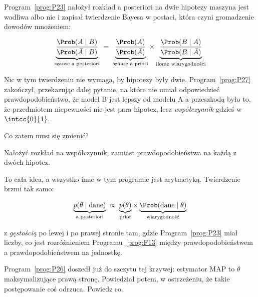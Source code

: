 \begin{fr}
Program~\ref{prog:P23} nałożył rozkład a posteriori na dwie hipotezy
\dash{} maszyna jest wadliwa albo nie \dash{} i zapisał twierdzenie Bayesa w
postaci, która czyni gromadzenie dowodów mnożeniem:

\[ \underbrace{\frac{\Prob(A \mid B)}{\Prob(\bar{A} \mid B)}}_{\text{szanse a posteriori}}
   \;=\;
   \underbrace{\frac{\Prob(A)}{\Prob(\bar{A})}}_{\text{szanse a priori}}
   \times
   \underbrace{\frac{\Prob(B \mid A)}{\Prob(B \mid \bar{A})}}_{\text{iloraz wiarygodności}} \]

Nic w tym twierdzeniu nie wymaga, by hipotezy były dwie.
Program~\ref{prog:P27} zakończył, przekazując dalej pytanie, na które nie
umiał odpowiedzieć \dash{} prawdopodobieństwo, że model B jest lepszy od
modelu A \dash{} a przeszkodą było to, że przedmiotem niepewności nie jest
para hipotez, lecz \emph{współczynnik} gdzieś w $\intcc{0}{1}$.

Co zatem musi się zmienić?
\dotline
\nextframe
\end{fr}

\begin{fr}
\begin{ansblock}
Nałożyć rozkład na współczynnik, zamiast prawdopodobieństwa na każdą z dwóch
hipotez.
\end{ansblock}

To cała idea, a wszystko inne w tym programie jest arytmetyką. Twierdzenie
brzmi tak samo:

\[ \underbrace{p(\theta \mid \text{dane})}_{\text{a posteriori}}
   \;\propto\;
   \underbrace{p(\theta)}_{\text{prior}}
   \times
   \underbrace{\Prob(\text{dane} \mid \theta)}_{\text{wiarygodność}} \]

z \emph{gęstością} po lewej i po prawej stronie tam, gdzie
Program~\ref{prog:P23} miał liczby, co jest rozróżnieniem
Programu~\ref{prog:F13} między prawdopodobieństwem a prawdopodobieństwem na
jednostkę.

Program~\ref{prog:P26} doszedł już do szczytu tej krzywej: estymator MAP to
$\theta$ maksymalizujące prawą stronę. Powiedział potem, w ostrzeżeniu, że
takie postępowanie coś odrzuca. Powiedz co.
\dotline
\nextframe
\end{fr}

